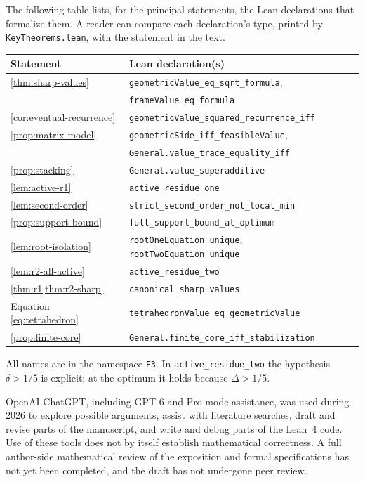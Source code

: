 \documentclass[11pt]{article}
\numberwithin{equation}{section}
\theoremstyle{definition}
\theoremstyle{definition}
\begin{document}
The following table lists, for the principal statements, the Lean
declarations that formalize them. A reader can compare each
declaration's type, printed by \texttt{KeyTheorems.lean}, with the
statement in the text.

\begin{center}\small
\begin{tabular}{@{}ll@{}}
\toprule
Statement & Lean declaration(s)\\
\midrule
\cref{thm:sharp-values} & \texttt{geometricValue\_eq\_sqrt\_formula},\\
 & \texttt{frameValue\_eq\_formula}\\
\cref{cor:eventual-recurrence} & \texttt{geometricValue\_squared\_recurrence\_iff}\\
\cref{prop:matrix-model} & \texttt{geometricSide\_iff\_feasibleValue},\\
 & \texttt{General.value\_trace\_equality\_iff}\\
\cref{prop:stacking} & \texttt{General.value\_superadditive}\\
\cref{lem:active-r1} & \texttt{active\_residue\_one}\\
\cref{lem:second-order} & \texttt{strict\_second\_order\_not\_local\_min}\\
\cref{prop:support-bound} & \texttt{full\_support\_bound\_at\_optimum}\\
\cref{lem:root-isolation} & \texttt{rootOneEquation\_unique},
 \texttt{rootTwoEquation\_unique}\\
\cref{lem:r2-all-active} & \texttt{active\_residue\_two}\\
\cref{thm:r1,thm:r2-sharp} & \texttt{canonical\_sharp\_values}\\
Equation \eqref{eq:tetrahedron} & \texttt{tetrahedronValue\_eq\_geometricValue}\\
\cref{prop:finite-core} & \texttt{General.finite\_core\_iff\_stabilization}\\
\bottomrule
\end{tabular}
\end{center}
All names are in the namespace \texttt{F3}. In
\texttt{active\_residue\_two} the hypothesis $\delta>1/5$ is explicit;
at the optimum it holds because $\Delta>1/5$.

OpenAI ChatGPT, including GPT-6 and Pro-mode assistance, was used
during 2026 to explore possible arguments, assist with literature
searches, draft and revise parts of the manuscript, and write and
debug parts of the Lean~4 code. Use of these tools does not by
itself establish mathematical correctness. A full author-side
mathematical review of the exposition and formal specifications has
not yet been completed, and the draft has not undergone peer review.
\end{document}
